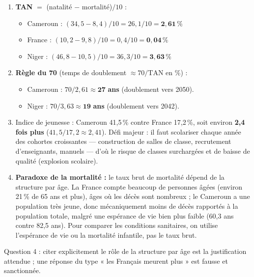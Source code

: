 \documentclass[11pt]{article}
\newcommand{\cle}[1]{{\popxbold\color{popdark}#1}}
\begin{document}
\begin{corrige}
\begin{enumerate}
    \item \textbf{TAN} $=$ (natalité $-$ mortalité)$/10$ :
    \begin{itemize}
        \item Cameroun : $(34,5 - 8,4)/10 = 26,1/10 = \mathbf{2,61\,\%}$
        \item France : $(10,2 - 9,8)/10 = 0,4/10 = \mathbf{0,04\,\%}$
        \item Niger : $(46,8 - 10,5)/10 = 36,3/10 = \mathbf{3,63\,\%}$
    \end{itemize}
    \item \textbf{Règle du 70} (temps de doublement $\approx 70/\text{TAN en \%}$) :
    \begin{itemize}
        \item Cameroun : $70/2,61 \approx \mathbf{27}$ \textbf{ans} (doublement vers 2050).
        \item Niger : $70/3,63 \approx \mathbf{19}$ \textbf{ans} (doublement vers 2042).
    \end{itemize}
    \item Indice de jeunesse : Cameroun 41,5\,\% contre France 17,2\,\%, soit environ \textbf{2,4 fois plus} ($41,5/17,2 \approx 2,41$). Défi majeur : il faut scolariser chaque année des cohortes croissantes — construction de salles de classe, recrutement d'enseignants, manuels — d'où le risque de classes surchargées et de baisse de qualité (\cle{explosion scolaire}).
    \item \textbf{Paradoxe de la mortalité :} le taux brut de mortalité dépend de la \cle{structure par âge}. La France compte beaucoup de personnes âgées (environ 21\,\% de 65 ans et plus), âges où les décès sont nombreux ; le Cameroun a une population très jeune, donc mécaniquement moins de décès rapportés à la population totale, malgré une espérance de vie bien plus faible (60,3 ans contre 82,5 ans). Pour comparer les conditions sanitaires, on utilise l'espérance de vie ou la mortalité infantile, pas le taux brut.
\end{enumerate}
\end{corrige}

\begin{attention}
Question 4 : citer explicitement le rôle de la structure par âge est la justification attendue ; une réponse du type « les Français meurent plus » est fausse et sanctionnée.
\end{attention}
\end{document}
